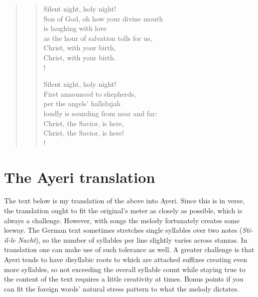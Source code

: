 \documentclass[12pt,paper=a4]{scrartcl}
\newcommand{\fw}[1]{\textit{#1}} %
\begin{document}
\begin{quote}
\begin{minipage}{.5\linewidth}
\begin{verse}
\begin{patverse}
Silent night, holy night!\\
Son of God, oh how your divine mouth\\
is laughing with love\\
as the hour of salvation tolls for us,\\
Christ, with your birth,\\
Christ, with your birth.\\!
\end{patverse}

\begin{patverse}
Silent night, holy night!\\
First announced to shepherds,\\
per the angels' hallelujah\\
loudly is sounding from near and far:\\
Christ, the Savior, is here,\\
Christ, the Savior, is here!\\!
\end{patverse}
\end{verse}
\end{minipage}
\end{quote}

\section{The Ayeri translation}
The text below is my translation of the above into Ayeri. Since this is in
verse, the translation ought to fit the original's meter as closely as
possible, which is always a challenge. However, with songs the melody
fortunately creates some leeway. The German text sometimes stretches single
syllables over two notes (\fw{Sti-il-le Nacht}), so the number of syllables per
line slightly varies across stanzas. In translation one can make use of such
tolerance as well. A greater challenge is that Ayeri tends to have disyllabic
roots to which are attached suffixes creating even more syllables, so not
exceeding the overall syllable count while staying true to the content of the
text requires a little creativity at times. Bonus points if you can fit the
foreign words' natural stress pattern to what the melody dictates.
\end{document}
